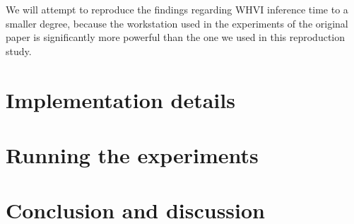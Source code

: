 \documentclass[11pt]{article}
\begin{document}
    We will attempt to reproduce the findings regarding WHVI inference time to a smaller degree, because the workstation used in the experiments of the original paper is significantly more powerful than the one we used in this reproduction study.

    \section{Implementation details}\label{sec:implementation-details}


    \section{Running the experiments}\label{sec:running-the-experiments}


    \section{Conclusion and discussion}\label{sec:conclusion-and-discussion}
\end{document}
